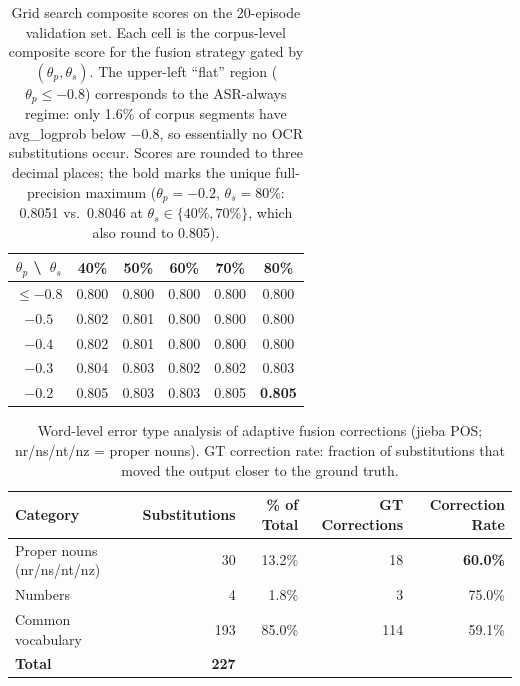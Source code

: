 \documentclass[11pt]{article}
\begin{document}
\begin{table}[t]
\centering
\caption{Grid search composite scores on the 20-episode validation set. Each cell is the corpus-level composite score for the fusion strategy gated by $(\theta_p, \theta_s)$. The upper-left ``flat'' region ($\theta_p \leq -0.8$) corresponds to the ASR-always regime: only 1.6\% of corpus segments have avg\_logprob below $-0.8$, so essentially no OCR substitutions occur. Scores are rounded to three decimal places; the bold marks the unique full-precision maximum ($\theta_p{=}-0.2$, $\theta_s{=}80\%$: 0.8051 vs.\ 0.8046 at $\theta_s{\in}\{40\%,70\%\}$, which also round to 0.805).}
\label{tab:param_grid}
\begin{tabular}{c|ccccc}
\toprule
$\theta_p$ \textbackslash\ $\theta_s$ & 40\% & 50\% & 60\% & 70\% & 80\% \\
\midrule
$\leq -0.8$ & 0.800 & 0.800 & 0.800 & 0.800 & 0.800 \\
$-0.5$      & 0.802 & 0.801 & 0.800 & 0.800 & 0.800 \\
$-0.4$      & 0.802 & 0.801 & 0.800 & 0.800 & 0.800 \\
$-0.3$      & 0.804 & 0.803 & 0.802 & 0.802 & 0.803 \\
$-0.2$      & 0.805 & 0.803 & 0.803 & 0.805 & \textbf{0.805} \\
\bottomrule
\end{tabular}
\end{table}

\begin{table}[t]
\centering
\caption{Word-level error type analysis of adaptive fusion corrections (jieba POS; nr/ns/nt/nz = proper nouns). GT correction rate: fraction of substitutions that moved the output closer to the ground truth.}
\label{tab:error_type}
\begin{tabular}{lrrrr}
\toprule
\textbf{Category} & \textbf{Substitutions} & \textbf{\% of Total} & \textbf{GT Corrections} & \textbf{Correction Rate} \\
\midrule
Proper nouns (nr/ns/nt/nz) &  30 & 13.2\% & 18 & \textbf{60.0\%} \\
Numbers                    &   4 &  1.8\% &  3 & 75.0\% \\
Common vocabulary          & 193 & 85.0\% & 114 & 59.1\% \\
\midrule
\textbf{Total}             & \textbf{227} & & & \\
\bottomrule
\end{tabular}
\end{table}
\end{document}
